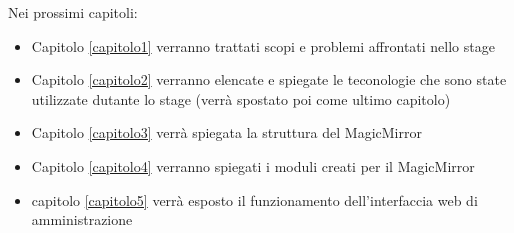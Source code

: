 Nei prossimi capitoli:
\begin{itemize}
\item Capitolo \ref{capitolo1} verranno trattati scopi e problemi affrontati nello stage
\item Capitolo \ref{capitolo2} verranno elencate e spiegate le teconologie che sono state utilizzate
dutante lo stage (verr\`a spostato poi come ultimo capitolo)
\item Capitolo \ref{capitolo3} verr\`a spiegata la struttura del MagicMirror
\item Capitolo \ref{capitolo4} verranno spiegati i moduli creati per il MagicMirror
\item capitolo \ref{capitolo5} verr\`a esposto il funzionamento dell'interfaccia web di amministrazione
\end{itemize}

